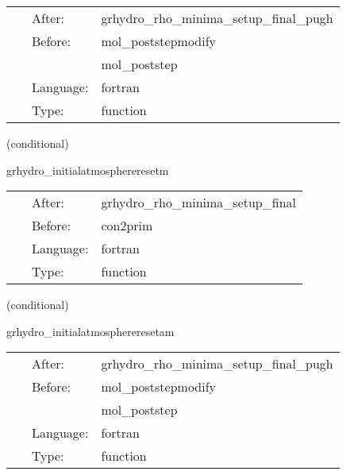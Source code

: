 \documentclass{article}
\begin{document}
 \begin{tabular*}{160mm}{cll} 
~ & After:  & grhydro\_rho\_minima\_setup\_final\_pugh \\ 
~ & Before:  & mol\_poststepmodify \\ 
~& ~ &mol\_poststep\\ 
~ & Language:  & fortran \\ 
~ & Type:  & function \\ 
\end{tabular*} 


\vspace{5mm}

   (conditional) 

\hspace{5mm} grhydro\_initialatmosphereresetm 

\hspace{5mm}{\it use mask to enforce atmosphere at initial time } 


\hspace{5mm}

 \begin{tabular*}{160mm}{cll} 
~ & After:  & grhydro\_rho\_minima\_setup\_final \\ 
~ & Before:  & con2prim \\ 
~ & Language:  & fortran \\ 
~ & Type:  & function \\ 
\end{tabular*} 


\vspace{5mm}

   (conditional) 

\hspace{5mm} grhydro\_initialatmosphereresetam 

\hspace{5mm}{\it use mask to enforce atmosphere at initial time } 


\hspace{5mm}

 \begin{tabular*}{160mm}{cll} 
~ & After:  & grhydro\_rho\_minima\_setup\_final\_pugh \\ 
~ & Before:  & mol\_poststepmodify \\ 
~& ~ &mol\_poststep\\ 
~ & Language:  & fortran \\ 
~ & Type:  & function \\ 
\end{tabular*} 
\end{document}
